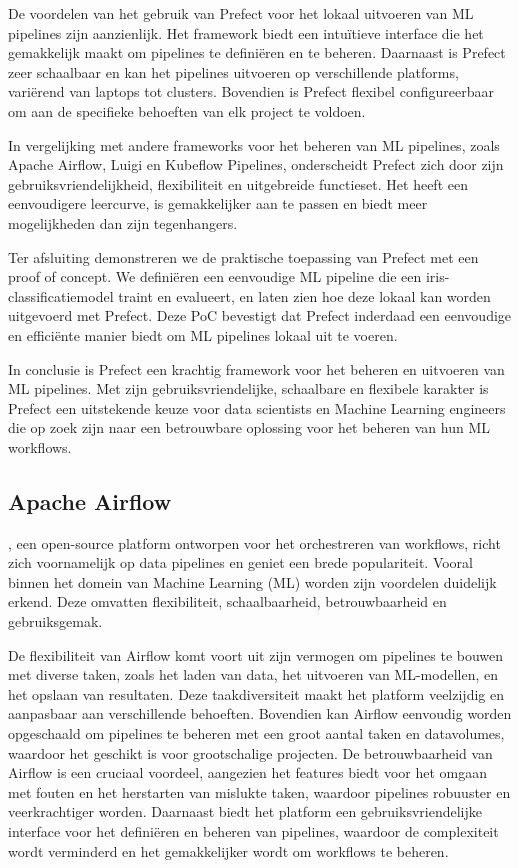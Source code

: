 De voordelen van het gebruik van Prefect voor het lokaal uitvoeren van ML pipelines zijn aanzienlijk. Het framework biedt een intuïtieve interface die het gemakkelijk maakt om pipelines te definiëren en te beheren. Daarnaast is Prefect zeer schaalbaar en kan het pipelines uitvoeren op verschillende platforms, variërend van laptops tot clusters. Bovendien is Prefect flexibel configureerbaar om aan de specifieke behoeften van elk project te voldoen.

In vergelijking met andere frameworks voor het beheren van ML pipelines, zoals Apache Airflow, Luigi en Kubeflow Pipelines, onderscheidt Prefect zich door zijn gebruiksvriendelijkheid, flexibiliteit en uitgebreide functieset. Het heeft een eenvoudigere leercurve, is gemakkelijker aan te passen en biedt meer mogelijkheden dan zijn tegenhangers.

Ter afsluiting demonstreren we de praktische toepassing van Prefect met een proof of concept. We definiëren een eenvoudige ML pipeline die een iris-classificatiemodel traint en evalueert, en laten zien hoe deze lokaal kan worden uitgevoerd met Prefect. Deze PoC bevestigt dat Prefect inderdaad een eenvoudige en efficiënte manier biedt om ML pipelines lokaal uit te voeren.

In conclusie is Prefect een krachtig framework voor het beheren en uitvoeren van ML pipelines. Met zijn gebruiksvriendelijke, schaalbare en flexibele karakter is Prefect een uitstekende keuze voor data scientists en Machine Learning engineers die op zoek zijn naar een betrouwbare oplossing voor het beheren van hun ML workflows.

\subsection{Apache Airflow}

\textcite{ApacheAirflow2024}, een open-source platform ontworpen voor het orchestreren van workflows, richt zich voornamelijk op data pipelines en geniet een brede populariteit. Vooral binnen het domein van Machine Learning (ML) worden zijn voordelen duidelijk erkend. Deze omvatten flexibiliteit, schaalbaarheid, betrouwbaarheid en gebruiksgemak.

De flexibiliteit van Airflow komt voort uit zijn vermogen om pipelines te bouwen met diverse taken, zoals het laden van data, het uitvoeren van ML-modellen, en het opslaan van resultaten. Deze taakdiversiteit maakt het platform veelzijdig en aanpasbaar aan verschillende behoeften. Bovendien kan Airflow eenvoudig worden opgeschaald om pipelines te beheren met een groot aantal taken en datavolumes, waardoor het geschikt is voor grootschalige projecten. De betrouwbaarheid van Airflow is een cruciaal voordeel, aangezien het features biedt voor het omgaan met fouten en het herstarten van mislukte taken, waardoor pipelines robuuster en veerkrachtiger worden. Daarnaast biedt het platform een gebruiksvriendelijke interface voor het definiëren en beheren van pipelines, waardoor de complexiteit wordt verminderd en het gemakkelijker wordt om workflows te beheren.

